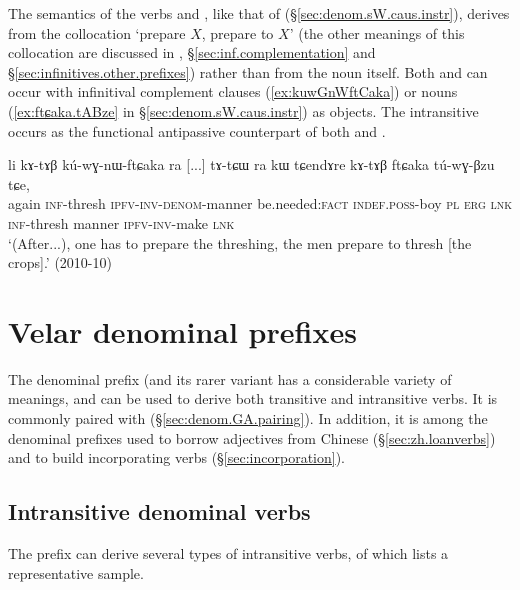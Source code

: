 The semantics of the verbs  and , like  that of  (§\ref{sec:denom.sW.caus.instr}), derives from the collocation  `prepare $X$, prepare to $X$' (the other meanings of this collocation are discussed in \citealt[240]{jacques16complementation}, §\ref{sec:inf.complementation}
and  §\ref{sec:infinitives.other.prefixes}) rather than from the noun  itself. Both   and  can occur with infinitival complement clauses (\ref{ex:kuwGnWftCaka}) or nouns (\ref{ex:ftɕaka.tABze} in §\ref{sec:denom.sW.caus.instr}) as objects. The intransitive  occurs as the functional antipassive counterpart of both  and .

\begin{exe}
\ex \label{ex:kuwGnWftCaka}
 \gll li kɤ-tɤβ kú-wɣ-nɯ-ftɕaka ra [...] tɤ-tɕɯ ra kɯ tɕendɤre kɤ-tɤβ ftɕaka tú-wɣ-βzu tɕe, \\
 again \textsc{inf}-thresh \textsc{ipfv}-\textsc{inv}-\textsc{denom}-manner be.needed:\textsc{fact} { } \textsc{indef}.\textsc{poss}-boy \textsc{pl} \textsc{erg} \textsc{lnk} \textsc{inf}-thresh manner \textsc{ipfv}-\textsc{inv}-make \textsc{lnk} \\
\glt `(After...), one has to prepare the threshing, the men prepare to thresh [the crops].' (2010-10)
\end{exe}
 
\section{Velar denominal prefixes} \label{sec:denom.GW}
The  denominal prefix (and its rarer variant  has a considerable variety of meanings, and can be used to derive both transitive and intransitive verbs. It is commonly paired with  (§\ref{sec:denom.GA.pairing}). In addition, it is among the denominal prefixes used to borrow adjectives from Chinese (§\ref{sec:zh.loanverbs}) and to build incorporating verbs (§\ref{sec:incorporation}).

\subsection{Intransitive denominal verbs}  \label{sec:denom.intr.GA}
The  prefix can derive several types of intransitive verbs, of which  lists a representative sample.


